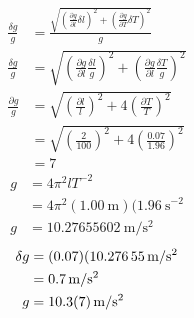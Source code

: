 \documentclass{article}
\begin{document}
\hr

\begin{align*}
	\frac{\delta g}{g} & = \frac{\sqrt{ \left( \frac{\partial g}{\partial l}\delta l \right)^2 + \left( \frac{\partial g}{\partial T}\delta T \right)^2 }}{g} \\
	\frac{\delta g}{g} & = \sqrt{ \left( \frac{\partial g}{\partial l}\frac{\delta l}{g} \right)^2 + \left( \frac{\partial g}{\partial l}\frac{\delta T}{g} \right)^2 } \\
	\frac{\partial g}{g} & = \sqrt{\left( \frac{\partial l}{l} \right)^2 + 4 \left(\frac{\partial T}{T} \right)^2} \\
	& = \sqrt{\left( \frac{2}{100} \right)^2 + 4 \left( \frac{0.07}{1.96} \right)^2} \\
	& = 7%
\end{align*}
\begin{align*}
	g & = 4\pi^2lT^{-2} \\
	  & = 4\pi^2(\SI{1.00}{\meter})(\SI{1.96}{\second}^{-2} \\
	g & = \SI{10.27655602}{\meter \per \second^2}
\end{align*}
\begin{align*}
	\delta g & = (0.07)(\SI{10.27655}{\meter \per \second^2} \\
			 & = \SI{0.7}{\meter \per \second^2} \\
	g & = \SI{10.3 \pm 0.7}{\meter \per \second^2}
\end{align*}
\end{document}
